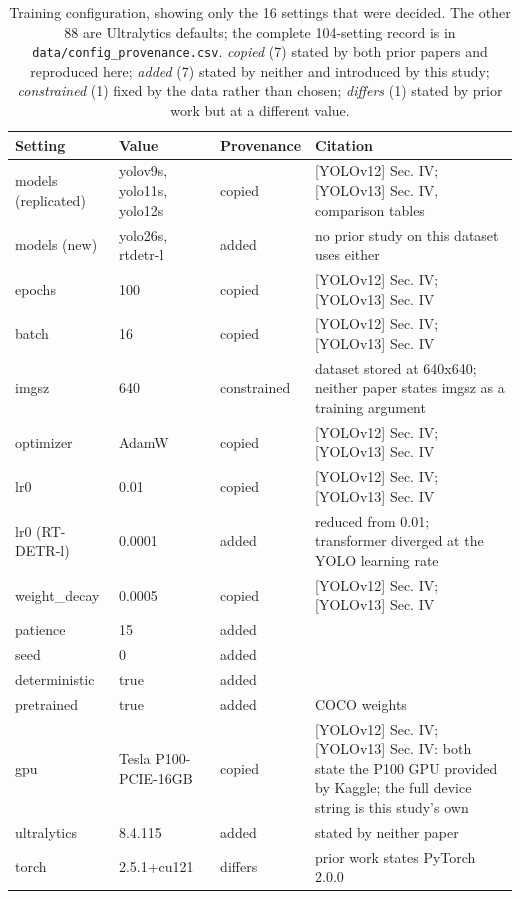 \begin{table}[t]
  \centering
  \caption{Training configuration, showing only the 16 settings that were decided. The other 88 are Ultralytics defaults; the complete 104-setting record is in \texttt{data/config\_provenance.csv}. \emph{copied} (7) stated by both prior papers and reproduced here; \emph{added} (7) stated by neither and introduced by this study; \emph{constrained} (1) fixed by the data rather than chosen; \emph{differs} (1) stated by prior work but at a different value.}
  \label{tab:training-config}
  \footnotesize
  \begin{tabular}{lllp{}}
    \toprule
    Setting & Value & Provenance & Citation \\
    \midrule
    models (replicated) & yolov9s, yolo11s, yolo12s & copied & [YOLOv12] Sec. IV; [YOLOv13] Sec. IV, comparison tables \\
    models (new) & yolo26s, rtdetr-l & added & no prior study on this dataset uses either \\
    epochs & 100 & copied & [YOLOv12] Sec. IV; [YOLOv13] Sec. IV \\
    batch & 16 & copied & [YOLOv12] Sec. IV; [YOLOv13] Sec. IV \\
    imgsz & 640 & constrained & dataset stored at 640x640; neither paper states imgsz as a training argument \\
    optimizer & AdamW & copied & [YOLOv12] Sec. IV; [YOLOv13] Sec. IV \\
    lr0 & 0.01 & copied & [YOLOv12] Sec. IV; [YOLOv13] Sec. IV \\
    lr0 (RT-DETR-l) & 0.0001 & added & reduced from 0.01; transformer diverged at the YOLO learning rate \\
    weight\_decay & 0.0005 & copied & [YOLOv12] Sec. IV; [YOLOv13] Sec. IV \\
    patience & 15 & added &  \\
    seed & 0 & added &  \\
    deterministic & true & added &  \\
    pretrained & true & added & COCO weights \\
    gpu & Tesla P100-PCIE-16GB & copied & [YOLOv12] Sec. IV; [YOLOv13] Sec. IV: both state the P100 GPU provided by Kaggle; the full device string is this study's own \\
    ultralytics & 8.4.115 & added & stated by neither paper \\
    torch & 2.5.1+cu121 & differs & prior work states PyTorch 2.0.0 \\
    \bottomrule
  \end{tabular}
\end{table}
